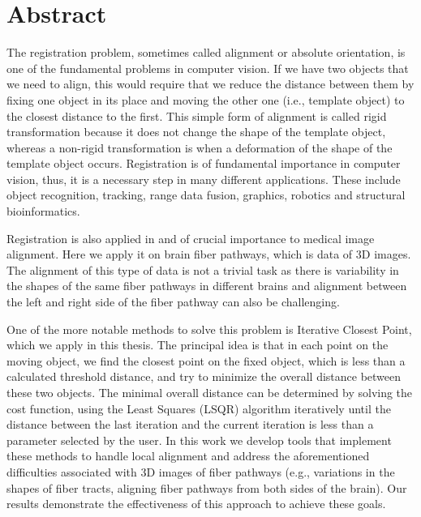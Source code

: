 \documentclass[../structure.tex]{subfiles}
\begin{document}
\chapter{Abstract}
The registration problem, sometimes called alignment or absolute orientation, is one of the fundamental problems in computer vision. If we have two objects that we need to align, this would require that we reduce the distance between them by fixing one object in its place and moving the other one (i.e., template object) to the closest distance to the first. This simple form of alignment is called rigid transformation because it does not change the shape of the template object, whereas a non-rigid transformation is when a deformation of the shape of the template object occurs. Registration is of fundamental importance in computer vision, thus, it is a necessary step in many different applications. These include object recognition, tracking, range data fusion, graphics, robotics and structural bioinformatics.

Registration is also applied in and of crucial importance to medical image alignment. Here we apply it on brain fiber pathways, which is data of 3D images. The alignment of this type of data is not a trivial task as there is variability  in the shapes of the same fiber pathways in different brains and alignment between the left and right side of the fiber pathway can also be challenging.

One of the more notable methods to solve this problem is Iterative Closest Point, which we apply in this thesis. The principal idea is that in each point on the moving object, we find the closest point on the fixed object, which is less than a calculated threshold distance, and try to minimize the overall distance between these two objects. The minimal overall distance can be determined by solving the cost function, using the Least Squares (LSQR) algorithm iteratively until the distance between the last iteration and the current iteration is less than a parameter selected by the user. In this work we develop tools that implement these methods to handle local alignment and address the aforementioned difficulties associated with 3D images of fiber pathways (e.g., variations in the shapes of fiber tracts, aligning fiber pathways from both sides of the brain). Our results demonstrate the effectiveness of this approach to achieve these goals.
\end{document}
